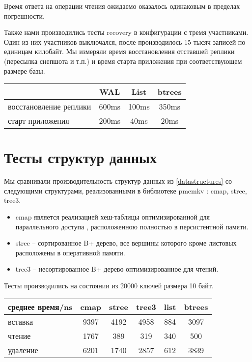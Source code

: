 \documentclass[pdftex,ptm,12pt,a4paper]{report}
\theoremstyle{definition}
\begin{document}
Время ответа на операции чтения ожидаемо оказалось одинаковым в пределах погрешности.

Также нами производились тесты recovery в конфигурации с тремя участниками.
Один из них участников выключался, после производилось 15 тысяч записей по единицам килобайт.
Мы измеряли время восстановления отставшей реплики (пересылка снепшота и т.п.) и время старта приложения при соответствующем размере базы.

\begin{center}
\begin{tabular} {|l |c c c|}
\hline
 & WAL & List & btrees \\
\hline
восстановление реплики & 600ms & 100ms & 350ms \\
старт приложения & 200ms & 40ms & 20ms \\
\hline
\end{tabular}
\end{center}


\section{Тесты структур данных}
\label{pmemkvtests}

Мы сравнивали производительность структур данных из \ref{datastructures} со следующими структурами, реализованными в
библиотеке pmemkv \cite{pmemkv}: cmap, stree, tree3.

\begin{itemize}
\item cmap является реализацией хеш-таблицы оптимизированной для параллельного доступа \cite{malakhov2015perbucket}, расположенною полностью в персистентной памяти.
\item stree -- сортированное B+ дерево, все вершины которого кроме листовых расположены в оперативной памяти.
\item tree3 -- несортированное B+ дерево оптимизированное для чтений.
\end{itemize}

Тесты производились на состоянии из 20000 ключей размера 10 байт.

\begin{center}
\begin{tabular} {|l| c c c c c|}
\hline
среднее время/ns & cmap & stree & tree3 & list & btrees \\
\hline
вставка & 9397 & 4192 & 4958 & 884 & 3097 \\
чтение & 1767 & 389 & 319 & 340 & 500 \\
удаление & 6201 & 1740 & 2857 & 612 & 3839 \\
\hline
\end{tabular}
\end{center}
\end{document}
